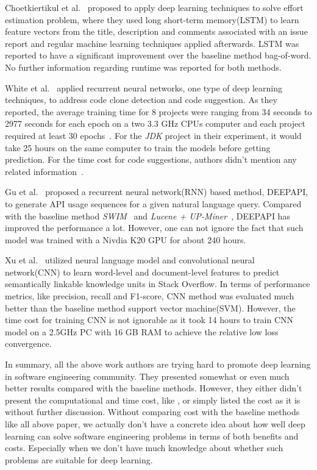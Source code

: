 \documentclass[sigconf,review, anonymous]{acmart}
\theoremstyle{break}
\begin{document}
 Choetkiertikul et al.~\cite{choetkiertikul2016deep} proposed to apply deep learning techniques
 to solve effort estimation problem, where they used long short-term memory(LSTM) to learn
 feature vectors from the title, description and comments associated with an issue report and
 regular machine learning techniques applied afterwards. LSTM was reported to have a 
 significant improvement over the baseline method bag-of-word. No further information regarding
 runtime was reported for both methods.
 
 White et al.~\cite{white2015toward, white2016deep} applied
 recurrent neural networks, one type of  deep learning techniques, 
 to address code clone detection and code suggestion. As they reported,
 the average training time for 8 projects were ranging from 34 seconds
  to 2977 seconds for each epoch on a two 3.3 GHz
 CPUs computer and each project required at least 30 epochs~\cite{white2016deep}.
 For the {\it JDK} project in their experiment, it would take 25 hours 
 on the same computer to train the models before getting prediction.
 For the time cost for code suggestions, authors didn't mention any related information~\cite{white2015toward}.

Gu et al.~\cite{gu2016deep} proposed  a recurrent neural network(RNN)
 based method, D{\scriptsize EEP}API, to generate API usage sequences for a given natural language query. 
 Compared with the baseline method {\it SWIM}~\cite{raghothaman2016swim} and 
 {\it Lucene + UP-Miner}~\cite{wang2013mining},  D{\scriptsize EEP}API has improved the performance a lot.
 However, one can not ignore the fact that such model was trained with a Nivdia K20 GPU for about 240 hours.
 
 Xu et al.~\cite{xu2016predicting} utilized neural language model and  
 convolutional neural network(CNN) to  learn word-level and document-level features to
 predict semantically linkable knowledge units in Stack Overflow. 
 In terms of performance metrics, like precision, recall and F1-score,
 CNN method was evaluated much better than 
 the baseline method support vector machine(SVM). 
 However, the time cost for training CNN is not ignorable as it took
 14 hours to train CNN model on a 2.5GHz PC with 16 GB RAM 
 to achieve the relative low loss convergence.
 
 In summary, all the above work authors are trying hard to promote deep learning in software
 engineering community. They presented somewhat or even much better results compared with
 the baseline methods. However, they either didn't present the computational and time cost, like \cite{white2016deep,white2015toward,lam2015combining,choetkiertikul2016deep}, or simply listed
 the cost as it is without further discussion\cite{wang2016automatically, gu2016deep, xu2016predicting}. Without comparing cost with the baseline methods like all above paper,
 we actually don't have a concrete idea about how well deep learning can solve software engineering problems in terms of both benefits and costs. Especially when we don't have much knowledge about
 whether such problems are suitable for deep learning. 
 
\end{document}
